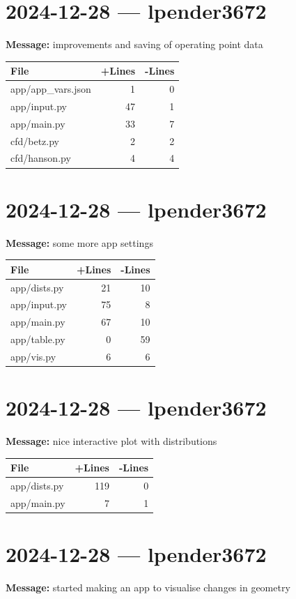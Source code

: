\documentclass{article}
\begin{document}
\section*{2024-12-28 --- lpender3672}
\textbf{Message:} improvements and saving of operating point data

\begin{longtable}{|p{10cm}|r|r|}
\hline \textbf{File} & \textbf{+Lines} & \textbf{-Lines} \\
\hline
app/app\_vars.json & 1 & 0 \\
\hline
app/input.py & 47 & 1 \\
\hline
app/main.py & 33 & 7 \\
\hline
cfd/betz.py & 2 & 2 \\
\hline
cfd/hanson.py & 4 & 4 \\
\hline
\end{longtable}

\section*{2024-12-28 --- lpender3672}
\textbf{Message:} some more app settings

\begin{longtable}{|p{10cm}|r|r|}
\hline \textbf{File} & \textbf{+Lines} & \textbf{-Lines} \\
\hline
app/dists.py & 21 & 10 \\
\hline
app/input.py & 75 & 8 \\
\hline
app/main.py & 67 & 10 \\
\hline
app/table.py & 0 & 59 \\
\hline
app/vis.py & 6 & 6 \\
\hline
\end{longtable}

\section*{2024-12-28 --- lpender3672}
\textbf{Message:} nice interactive plot with distributions

\begin{longtable}{|p{10cm}|r|r|}
\hline \textbf{File} & \textbf{+Lines} & \textbf{-Lines} \\
\hline
app/dists.py & 119 & 0 \\
\hline
app/main.py & 7 & 1 \\
\hline
\end{longtable}

\section*{2024-12-28 --- lpender3672}
\textbf{Message:} started making an app to visualise changes in geometry
\end{document}
